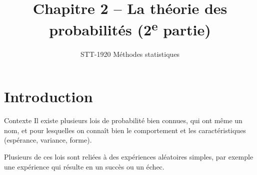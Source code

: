 \documentclass{BeamerTemplate}
\title{Chapitre 2 -- La théorie des probabilités (2\textsuperscript{e} partie)}
\subtitle{STT-1920 Méthodes statistiques}
\date{}
\begin{document}
\begin{frame}[t]
  \titlepage
\end{frame}

\section{Introduction}

\begin{frame}[t]{Contexte}
  Il existe plusieurs lois de probabilité bien connues, qui ont même un
  \alert{nom}, et pour lesquelles on connaît bien le comportement et les
  caractéristiques (espérance, variance, forme).

  \medskip
  Plusieurs de ces lois sont reliées à des expériences aléatoires simples, par
  exemple une expérience qui résulte en un \alert{succès} ou un \alert{échec}.

  \medskip
\end{frame}
\end{document}
